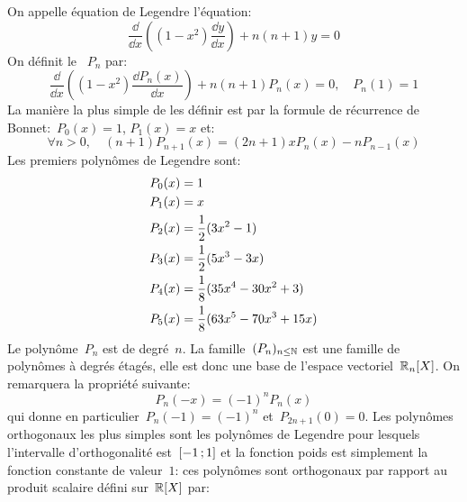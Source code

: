 On appelle équation de Legendre l'équation: 
\begin{equation}
\frac{\dd }{\dd x}\left((1-x^{2})\frac{\dd y}{\dd x}\right)+n(n+1)y=0
\end{equation}
On définit le ~$P_n$ par: 
\begin{equation}
\frac{\dd}{\dd x}\left((1-x^{2})\frac{\dd P_n(x)}{\dd x}\right)+n(n+1)P_n(x)=0,\quad P_n(1)=1
\end{equation}
La manière la plus simple de les définir est par la formule de récurrence de Bonnet:~$P_0(x)=1$, $P_1(x)=x$ et:
\begin{equation}
\forall n>0, \quad (n+1)P_{n+1}(x)=(2n+1)xP_n(x) - nP_{n-1}(x)
\end{equation}
Les premiers polynômes de Legendre sont:
\begin{equation}\colorgris
\begin{aligned}
&P_{0}(x)=1\\
&P_{1}(x)=x\\
&P_{2}(x)=\frac{1}{2}(3x^{2}-1)\\
&P_{3}(x)=\frac{1}{2}(5x^{3}-3x)\\
&P_{4}(x)=\frac{1}{8}(35x^{4}-30x^{2}+3)\\
&P_{5}(x)=\frac{1}{8}(63x^{5}-70x^{3}+15x)
\end{aligned}
\end{equation} 
Le polynôme~$P_n$ est de degré~$n$. La famille~$(P_n)_{n\leq \mathbb N}$ est une famille de polynômes à degrés étagés, elle est donc une base de l'espace vectoriel~$\mathbb R_n[X]$. On remarquera la propriété suivante: 
\begin{equation}
P_n(-x)=(-1)^nP_n(x)
\end{equation}
qui donne en particulier~$P_n( - 1) = ( - 1)^n$ et~$P_{2n + 1}(0) = 0$. Les polynômes orthogonaux les plus simples sont les polynômes de Legendre pour lesquels l'intervalle d'orthogonalité est~$\mathopen{[}-1\,;1\mathclose{]}$ et la fonction poids est simplement la fonction constante de valeur~$1$: ces polynômes sont orthogonaux par rapport au produit scalaire défini sur~$\mathbb R[X]$ par: 
